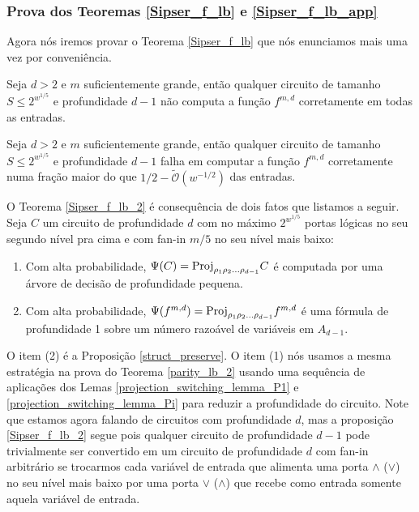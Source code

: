 \subsubsection{Prova dos Teoremas \ref{Sipser_f_lb} e \ref{Sipser_f_lb_app}}

Agora nós iremos provar o Teorema \ref{Sipser_f_lb} que nós enunciamos mais uma vez por conveniência.

\begin{teo} \label{Sipser_f_lb_2}

Seja $d > 2$ e $m$ suficientemente grande, então qualquer circuito de tamanho $S \leq 2^{w^{1/5}}$ e profundidade $d - 1$ não computa a função $f^{m, d}$ corretamente em todas as entradas.

\end{teo} 

\begin{teo} \label{Sipser_f_lb_app_2}

Seja $d > 2$ e $m$ suficientemente grande, então qualquer circuito de tamanho $S \leq 2^{w^{1/5}}$ e profundidade $d - 1$ falha em computar a função $f^{m, d}$ corretamente numa fração maior do que $1/2 - \widetilde{\mathcal{O}}(w^{-1/2})$ das entradas.

\end{teo}

O Teorema \ref{Sipser_f_lb_2} é consequência de dois fatos que listamos a seguir. Seja $C$ um circuito de profundidade $d$ com no máximo $2^{w^{1/5}}$ portas lógicas no seu segundo nível pra cima e com fan-in $m/5$ no seu nível mais baixo:

\begin{enumerate}

	\item Com alta probabilidade, $\Psi(C) = \text{Proj}_{\rho_{1}\rho_{2}\dots\rho_{d - 1}}C$ é  computada por uma árvore de decisão de profundidade pequena.
	
	\item Com alta probabilidade, $\Psi(f^{m, d}) = \text{Proj}_{\rho_{1}\rho_{2}\dots\rho_{d - 1}}f^{m, d}$ é uma fórmula de profundidade 1 sobre um número razoável de variáveis em $A_{d - 1}$.

\end{enumerate}

O item (2) é a Proposição \ref{struct_preserve}. O item (1) nós usamos a mesma estratégia na prova do Teorema \ref{parity_lb_2} usando uma sequência de aplicações dos Lemas \ref{projection_switching_lemma_P1} e \ref{projection_switching_lemma_Pi} para reduzir a profundidade do circuito. Note que estamos agora falando de circuitos com profundidade $d$, mas a proposição \ref{Sipser_f_lb_2} segue pois qualquer circuito de profundidade $d - 1$ pode trivialmente ser convertido em um circuito de profundidade $d$ com fan-in arbitrário se trocarmos cada variável de entrada que alimenta uma porta $\land$ ($\lor$) no seu nível mais baixo por uma porta $\lor$ ($\land$) que recebe como entrada somente aquela variável de entrada.

